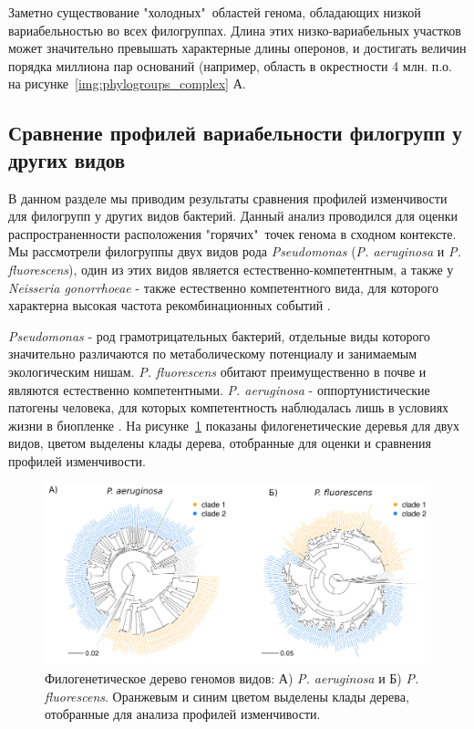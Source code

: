 Заметно существование "холодных"\ областей генома, обладающих низкой вариабельностью во всех филогруппах. Длина этих низко-вариабельных участков может значительно превышать характерные длины оперонов, и достигать величин порядка миллиона пар оснований (например, область в окрестности 4 млн. п.о. на рисунке~\ref{img:phylogroups_complex} А.

\subsection{Сравнение профилей вариабельности филогрупп у других видов}

В данном разделе мы приводим результаты сравнения профилей изменчивости для филогрупп у других видов бактерий. Данный анализ проводился для оценки распространенности расположения "горячих"\ точек генома в сходном контексте. Мы рассмотрели филогруппы двух видов рода \textit{Pseudomonas} (\textit{P. aeruginosa} и \textit{P. fluorescens}), один из этих видов является естественно-компетентным, а также у \textit{Neisseria gonorrhoeae} - также естественно компетентного вида, для которого характерна высокая частота рекомбинационных событий \cite{yu2014genome}.

\textit{Pseudomonas} - род грамотрицательных бактерий, отдельные виды которого значительно различаются по метаболическому потенциалу и занимаемым экологическим нишам. \textit{P. fluorescens} обитают преимущественно в почве и являются естественно компетентными. \textit{P. aeruginosa} - оппортунистические патогены человека, для которых компетентность наблюдалась лишь в условиях жизни в биопленке \cite{nolan2019pseudomonas}. На рисунке~\ref{img:pseudo_phylogroups} показаны филогенетические деревья для двух видов, цветом выделены клады дерева, отобранные для оценки и сравнения профилей изменчивости. 

\begin{figure}[!ht] 
  \center
    \includegraphics[width=\textwidth]{Dissertation/images/complexity/pseudo_phylogroups.png}
  \caption{Филогенетическое дерево геномов видов: А) \textit{P. aeruginosa} и Б) \textit{P. fluorescens}. Оранжевым и синим цветом выделены клады дерева, отобранные для анализа профилей изменчивости. }
  \label{img:pseudo_phylogroups} 
\end{figure}

